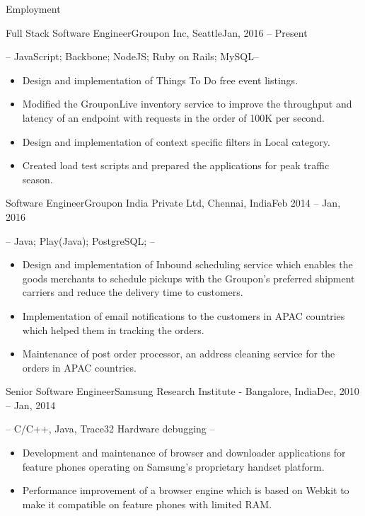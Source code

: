 \documentclass[]{mcdowellcv}
\begin{document}
	\makeheader
	\begin{cvsection}{Employment}
		\begin{cvsubsection}{Full Stack Software Engineer}{Groupon Inc, Seattle}{Jan, 2016 -- Present}
			\item {} -- JavaScript; Backbone; NodeJS; Ruby on Rails;  MySQL--
			\begin{itemize}
			 	\item Design and implementation of Things To Do free event listings.
				\item Modified the GrouponLive inventory service to improve the throughput and latency of an endpoint with requests in the order of 100K per second.
				\item Design and implementation of context specific filters in Local category.
				\item Created load test scripts and prepared the applications for peak traffic season.
			\end{itemize}
		\end{cvsubsection}

		\begin{cvsubsection}{Software Engineer}{Groupon India Private Ltd, Chennai, India}{Feb 2014 -- Jan, 2016}
			\item {} -- Java; Play(Java); PostgreSQL; --
			\begin{itemize}
				\item  Design and implementation of Inbound scheduling service which enables the goods merchants to schedule pickups with the Groupon's preferred shipment carriers and reduce the delivery time to customers.
				\item Implementation of email notifications to the customers in APAC countries which helped them in tracking the orders.
				\item Maintenance of post order processor, an address cleaning service for the orders in APAC countries.
			\end{itemize}
		\end{cvsubsection}

		\begin{cvsubsection}{Senior Software Engineer}{Samsung Research Institute - Bangalore, India}{Dec, 2010 -- Jan, 2014}

			\item  {} -- C/C++, Java, Trace32 Hardware debugging --
			\begin{itemize}
				\item Development and maintenance of browser and downloader applications for feature phones operating on Samsung's proprietary handset platform.
				\item Performance improvement of a browser engine which is based on Webkit to make it compatible on feature phones with limited RAM.
			\end{itemize}
		\end{cvsubsection}
	\end{cvsection}
\end{document}
